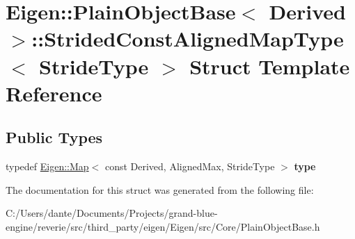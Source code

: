 \hypertarget{struct_eigen_1_1_plain_object_base_1_1_strided_const_aligned_map_type}{}\section{Eigen\+::Plain\+Object\+Base$<$ Derived $>$\+::Strided\+Const\+Aligned\+Map\+Type$<$ Stride\+Type $>$ Struct Template Reference}
\label{struct_eigen_1_1_plain_object_base_1_1_strided_const_aligned_map_type}
\subsection*{Public Types}
\begin{DoxyCompactItemize}
\item 
\mbox{\label{struct_eigen_1_1_plain_object_base_1_1_strided_const_aligned_map_type_aab9f66776da406ad79a73a9ab9793d63}} 
typedef \mbox{\hyperlink{class_eigen_1_1_map}{Eigen\+::\+Map}}$<$ const Derived, Aligned\+Max, Stride\+Type $>$ {\bfseries type}
\end{DoxyCompactItemize}


The documentation for this struct was generated from the following file\+:\begin{DoxyCompactItemize}
\item 
C\+:/\+Users/dante/\+Documents/\+Projects/grand-\/blue-\/engine/reverie/src/third\+\_\+party/eigen/\+Eigen/src/\+Core/Plain\+Object\+Base.\+h\end{DoxyCompactItemize}
